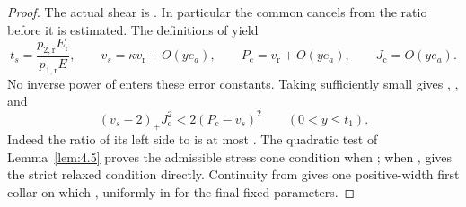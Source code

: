 \begin{proof}
The actual shear is . In particular the common
 cancels from the ratio  before it is estimated.
The definitions of  yield
\begin{equation}
  t_s=\frac{p_{2,\mathrm r}E_{\mathrm r}}{p_{1,\mathrm r}E},\qquad
  v_s=\kappa v_{\mathrm r}+O(ye_a),\qquad
  P_{\mathrm c}=v_{\mathrm r}+O(ye_a),\qquad
  J_{\mathrm c}=O(ye_a).
\tag{B.29}\label{eq:B.29}
\end{equation}
No inverse power of  enters these error constants. Taking
 sufficiently small gives
, , and
\[
  (v_s-2)_+J_{\mathrm c}^2<2(P_{\mathrm c}-v_s)^2
  \qquad(0<y\leq t_1).
\]
Indeed the ratio of its left side to  is at most
. The quadratic test of Lemma~\ref{lem:4.5} proves the admissible stress cone condition
when ; when ,
 gives the strict relaxed condition directly. Continuity from
 gives one positive-width first collar on which
, uniformly in  for the final fixed parameters.


\end{proof}
